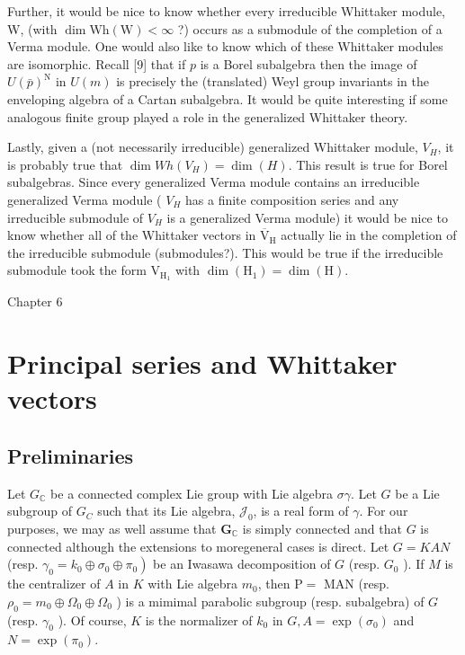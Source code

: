 \documentclass[10pt]{article}
\begin{document}
Further, it would be nice to know whether every irreducible Whittaker module, W, (with $\operatorname{dim} \mathrm{Wh}(\mathrm{W})<\infty$ ?) occurs as a submodule of the completion of a Verma module. One would also like to know which of these Whittaker modules are isomorphic. Recall [9] that if $p$ is a Borel subalgebra then the image of $U(\bar{p})^{\mathrm{N}}$ in $U(m)$ is precisely the (translated) Weyl group invariants in the enveloping algebra of a Cartan subalgebra. It would be quite interesting if some analogous finite group played a role in the generalized Whittaker theory.

Lastly, given a (not necessarily irreducible) generalized Whittaker module, $V_{H}$, it is probably true that $\operatorname{dim} W h\left(V_{H}\right)=\operatorname{dim}(H)$. This result is true for Borel subalgebras. Since every generalized Verma module contains an irreducible generalized Verma module ( $V_{H}$ has a finite composition series and any irreducible submodule of $V_{H}$ is a generalized Verma module) it would be nice to know whether all of the Whittaker vectors in $\overline{\mathrm{V}}_{\mathrm{H}}$ actually lie in the completion of the irreducible submodule (submodules?). This would be true if the irreducible submodule took the form $\mathrm{V}_{\mathrm{H}_{1}}$ with $\operatorname{dim}\left(\mathrm{H}_{1}\right)=\operatorname{dim}(\mathrm{H})$.

Chapter 6

\section{Principal series and Whittaker vectors}
\subsection{Preliminaries}
Let $G_{\mathbb{C}}$ be a connected complex Lie group with Lie algebra $\sigma \gamma$. Let $G$ be a Lie subgroup of $G_{C}$ such that its Lie algebra, $\mathcal{J}_{0}$, is a real form of $\mathcal{\gamma}$. For our purposes, we may as well assume that $\mathbf{G}_{\mathbb{C}}$ is simply connected and that $G$ is connected although the extensions to moregeneral cases is direct. Let $G=K A N$ (resp. $\left.\gamma_{0}=k_{0} \oplus \sigma_{0} \oplus \pi_{0}\right)$ be an Iwasawa decomposition of $G$ (resp. $G_{0}$ ). If $M$ is the centralizer of $A$ in $K$ with Lie algebra $m_{0}$, then $\mathrm{P}=$ MAN (resp. $\rho_{0}=m_{0} \oplus \Omega_{0} \oplus \Omega_{0}$ ) is a mimimal parabolic subgroup (resp. subalgebra) of $G$ (resp. $\gamma_{0}$ ). Of course, $K$ is the normalizer of $k_{0}$ in $G, A=\exp \left(\sigma_{0}\right)$ and $N=\exp \left(\pi_{0}\right)$.
\end{document}
